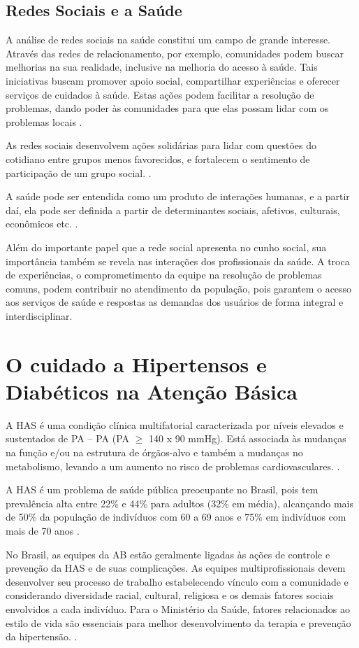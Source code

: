 \subsection{Redes Sociais e a Saúde}
A análise de redes sociais na saúde constitui um campo de grande interesse. Através das redes de relacionamento, por exemplo, comunidades podem buscar melhorias na sua realidade, inclusive na melhoria do acesso à saúde. Tais iniciativas buscam promover apoio social, compartilhar experiências e oferecer serviços de cuidados à saúde. Estas ações podem facilitar a resolução de problemas, dando poder às comunidades para que elas possam lidar com os problemas locais \cite{maior2004formaccao}.

As redes sociais desenvolvem ações solidárias para lidar com questões do cotidiano entre grupos menos favorecidos, e fortalecem o sentimento de participação de um grupo social. \cite{de2002apoio}. 

A saúde pode ser entendida como um produto de interações humanas, e a partir daí, ela pode ser definida a partir de determinantes sociais, afetivos, culturais, econômicos etc. \cite{martins2004redes}.

Além do importante papel que a rede social apresenta no cunho social, sua importância também se revela nas interações dos profissionais da saúde.  A troca de experiências, o comprometimento da equipe na resolução de problemas comuns, podem contribuir no atendimento da população, pois garantem o acesso aos serviços de saúde e respostas as demandas dos usuários de forma integral e interdisciplinar.

\section{O cuidado a Hipertensos e Diabéticos na Atenção Básica}
A \acrlong{HAS} é uma condição clínica multifatorial caracterizada por níveis elevados e sustentados de \acrlong{PA} – PA (PA $\geq$ 140 x 90 mmHg). Está associada às mudanças na função e/ou na estrutura de órgãos-alvo e também a mudanças no metabolismo, levando a um aumento no risco de problemas cardiovasculares. \cite{hipertenso}.

A HAS é um problema de saúde pública preocupante no Brasil, pois tem prevalência alta entre 22\% e 44\% para adultos (32\% em média), alcançando mais de 50\% da população de indivíduos com 60 a 69 anos e 75\% em indivíduos com mais de 70 anos \cite{hipertenso}.

No Brasil, as equipes da AB estão geralmente ligadas às ações de controle e prevenção da HAS e de suas complicações. As equipes multiprofissionais devem desenvolver seu processo de trabalho estabelecendo vínculo com a comunidade e considerando diversidade racial, cultural, religiosa e os demais fatores sociais envolvidos a cada indivíduo. Para o Ministério da Saúde, fatores relacionados ao estilo de vida são essenciais para melhor desenvolvimento da terapia e prevenção da hipertensão. \cite{atencaobasica37}.

